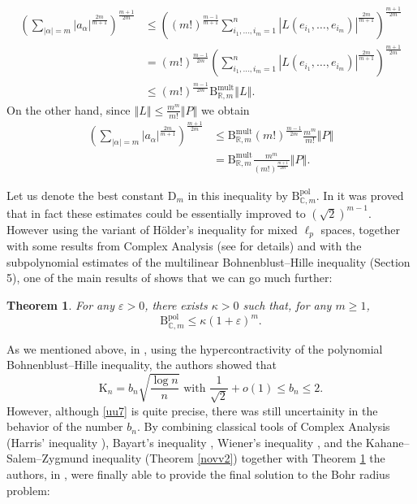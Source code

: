 \documentclass[10pt]{amsart}
\newtheorem{theorem}{Theorem}[section]
\numberwithin{equation}{section}
\begin{document}
\begin{align*}
\left( {\sum\limits_{\left\vert \alpha \right\vert =m}}\left\vert a_{\alpha
}\right\vert ^{\frac{2m}{m+1}}\right) ^{\frac{m+1}{2m}}& \leq \left( \left(
m!\right) ^{\frac{m-1}{m+1}}{\sum\limits_{i_{1},\ldots ,i_{m}=1}^{n}}\left\vert L(e_{i_{1}},\ldots ,e_{i_{m}})\right\vert ^{\frac{2m}{m+1}}\right) ^{\frac{m+1}{2m}} \\
& =\left( m!\right) ^{\frac{m-1}{2m}}\left( {\sum\limits_{i_{1},\ldots
,i_{m}=1}^{n}}\left\vert L(e_{i_{1}},\ldots ,e_{i_{m}})\right\vert ^{\frac{2m}{m+1}}\right) ^{\frac{m+1}{2m}} \\
& \leq \left( m!\right) ^{\frac{m-1}{2m}}\mathrm{B}_{\mathbb{R},m}^{\mathrm{mult}}\left\Vert L\right\Vert .
\end{align*}On the other hand, since $\left\Vert L\right\Vert \leq \frac{m^{m}}{m!}\left\Vert P\right\Vert $ we obtain
\begin{align*}
\left( {\sum\limits_{\left\vert \alpha \right\vert =m}}\left\vert a_{\alpha
}\right\vert ^{\frac{2m}{m+1}}\right) ^{\frac{m+1}{2m}}& \leq \mathrm{B}_{\mathbb{R},m}^{\mathrm{mult}}\left( m!\right) ^{\frac{m-1}{2m}}\frac{m^{m}}{m!}\left\Vert P\right\Vert \\
& =\mathrm{B}_{\mathbb{R},m}^{\mathrm{mult}}\frac{m^{m}}{\left( m!\right) ^{\frac{m+1}{2m}}}\left\Vert P\right\Vert .
\end{align*}

Let us denote the best constant $\mathrm{D}_{m}$ in this inequality by $\mathrm{B}_{\mathbb{C},m}^{\mathrm{pol}}$. In \cite{annals} it was proved
that in fact these estimates could be essentially improved to $\left( \sqrt{2}\right) ^{m-1}.$ However using the variant of H\"{o}lder's inequality for
mixed $\ell _{p}$ spaces, together with some results from Complex Analysis
(see \cite{bps} for details) and with the subpolynomial estimates of the
multilinear Bohnenblust--Hille inequality (Section 5), one of the main
results of \cite{bps} shows that we can go much further:

\begin{theorem}
\label{i8} For any $\varepsilon >0$, there exists $\kappa >0$ such that, for
any $m\geq 1$,
\begin{equation*}
\mathrm{B}_{\mathbb{C},m}^{\mathrm{pol}}\leq \kappa (1+\varepsilon )^{m}.
\end{equation*}
\end{theorem}

As we mentioned above, in \cite{annals}, using the hypercontractivity of the
polynomial Bohnenblust--Hille inequality, the authors showed that
\begin{equation}
\mathrm{K}_{n}=b_{n}\sqrt{\frac{\log n}{n}}\text{ with }\frac{1}{\sqrt{2}}+o(1)\leq b_{n}\leq 2.  \label{uu7}
\end{equation}
However, although \eqref{uu7} is quite precise, there was still uncertainity
in the behavior of the number $b_{n}$. By combining classical tools of
Complex Analysis (Harris' inequality \cite{Harris}), Bayart's inequality
\cite{bbbaaa}, Wiener's inequality \cite[Lemma 6.1]{bps}, and the
Kahane--Salem--Zygmund inequality (Theorem \ref{novv2}) together with
Theorem \ref{i8} the authors, in \cite{bps}, were finally able to provide
the final solution to the Bohr radius problem:
\end{document}
